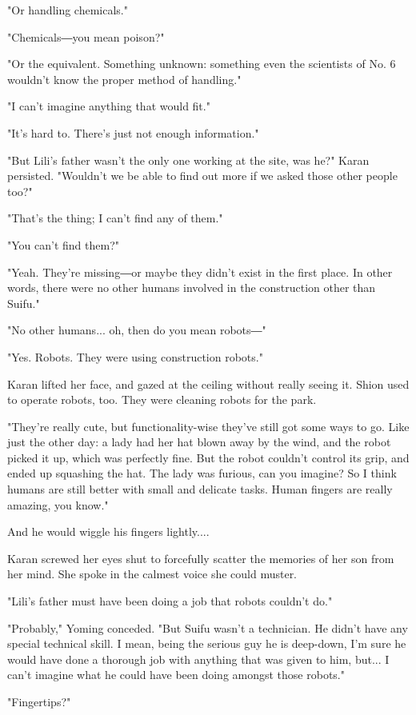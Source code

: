 "Or handling chemicals."

"Chemicals―you mean poison?"

"Or the equivalent. Something unknown: something even the scientists of
No. 6 wouldn't know the proper method of handling."

"I can't imagine anything that would fit."

"It's hard to. There's just not enough information."

"But Lili's father wasn't the only one working at the site, was he?"
Karan persisted. "Wouldn't we be able to find out more if we asked those
other people too?"

"That's the thing; I can't find any of them."

"You can't find them?"

"Yeah. They're missing―or maybe they didn't exist in the first place. In
other words, there were no other humans involved in the construction
other than Suifu."

"No other humans... oh, then do you mean robots―"

"Yes. Robots. They were using construction robots."

Karan lifted her face, and gazed at the ceiling without really seeing
it. Shion used to operate robots, too. They were cleaning robots for the
park.

"They're really cute, but functionality-wise they've still got some ways
to go. Like just the other day: a lady had her hat blown away by the
wind, and the robot picked it up, which was perfectly fine. But the
robot couldn't control its grip, and ended up squashing the hat. The
lady was furious, can you imagine? So I think humans are still better
with small and delicate tasks. Human fingers are really amazing, you
know."

And he would wiggle his fingers lightly....

Karan screwed her eyes shut to forcefully scatter the memories of her
son from her mind. She spoke in the calmest voice she could muster.

"Lili's father must have been doing a job that robots couldn't do."

"Probably," Yoming conceded. "But Suifu wasn't a technician. He didn't
have any special technical skill. I mean, being the serious guy he is
deep-down, I'm sure he would have done a thorough job with anything that
was given to him, but... I can't imagine what he could have been doing
amongst those robots."

"Fingertips?"


